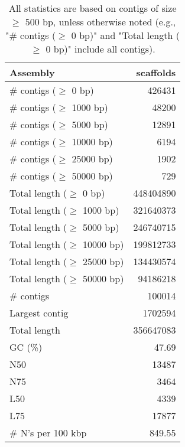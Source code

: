 \documentclass[12pt,a4paper]{article}
\begin{document}
\begin{table}[ht]
\begin{center}
\caption{All statistics are based on contigs of size $\geq$ 500 bp, unless otherwise noted (e.g., "\# contigs ($\geq$ 0 bp)" and "Total length ($\geq$ 0 bp)" include all contigs).}
\begin{tabular}{|l*{1}{|r}|}
\hline
Assembly & scaffolds \\ \hline
\# contigs ($\geq$ 0 bp) & 426431 \\ \hline
\# contigs ($\geq$ 1000 bp) & 48200 \\ \hline
\# contigs ($\geq$ 5000 bp) & 12891 \\ \hline
\# contigs ($\geq$ 10000 bp) & 6194 \\ \hline
\# contigs ($\geq$ 25000 bp) & 1902 \\ \hline
\# contigs ($\geq$ 50000 bp) & 729 \\ \hline
Total length ($\geq$ 0 bp) & 448404890 \\ \hline
Total length ($\geq$ 1000 bp) & 321640373 \\ \hline
Total length ($\geq$ 5000 bp) & 246740715 \\ \hline
Total length ($\geq$ 10000 bp) & 199812733 \\ \hline
Total length ($\geq$ 25000 bp) & 134430574 \\ \hline
Total length ($\geq$ 50000 bp) & 94186218 \\ \hline
\# contigs & 100014 \\ \hline
Largest contig & 1702594 \\ \hline
Total length & 356647083 \\ \hline
GC (\%) & 47.69 \\ \hline
N50 & 13487 \\ \hline
N75 & 3464 \\ \hline
L50 & 4339 \\ \hline
L75 & 17877 \\ \hline
\# N's per 100 kbp & 849.55 \\ \hline
\end{tabular}
\end{center}
\end{table}
\end{document}
